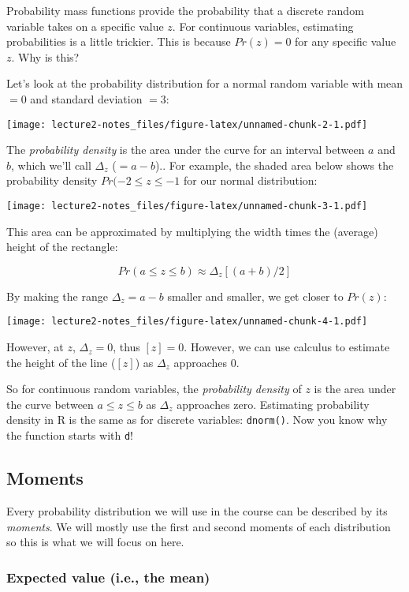 \documentclass[]{article}
\begin{document}
Probability mass functions provide the probability that a discrete
random variable takes on a specific value \(z\). For continuous
variables, estimating probabilities is a little trickier. This is
because \(Pr(z) = 0\) for any specific value \(z\). Why is this?

Let's look at the probability distribution for a normal random variable
with mean \(=0\) and standard deviation \(=3\):

\texttt{[image: lecture2-notes\_files/figure-latex/unnamed-chunk-2-1.pdf]}

The \emph{probability density} is the area under the curve for an
interval between \(a\) and \(b\), which we'll call \(\Delta_z\)
(\(=a-b\)).. For example, the shaded area below shows the probability
density \(Pr(-2 \leq z \leq -1\) for our normal distribution:

\texttt{[image: lecture2-notes\_files/figure-latex/unnamed-chunk-3-1.pdf]}

This area can be approximated by multiplying the width times the
(average) height of the rectangle:

\[Pr(a \leq z \leq b) \approx \Delta_z [(a + b)/2]\]

By making the range \(\Delta_z =a-b\) smaller and smaller, we get closer
to \(Pr(z)\):

\texttt{[image: lecture2-notes\_files/figure-latex/unnamed-chunk-4-1.pdf]}

However, at \(z\), \(\Delta_z =0\), thus \([z] = 0\). However, we can
use calculus to estimate the height of the line (\([z]\)) as
\(\Delta_z\) approaches 0.

So for continuous random variables, the \emph{probability density} of
\(z\) is the area under the curve between \(a \leq z \leq b\) as
\(\Delta_z\) approaches zero. Estimating probability density in R is the
same as for discrete variables: \texttt{dnorm()}. Now you know why the
function starts with \texttt{d}!

\hypertarget{moments}{%
\subsection{Moments}\label{moments}}

Every probability distribution we will use in the course can be
described by its \emph{moments}. We will mostly use the first and second
moments of each distribution so this is what we will focus on here.

\hypertarget{expected-value-i.e.-the-mean}{%
\subsubsection{Expected value (i.e., the
mean)}\label{expected-value-i.e.-the-mean}}
\end{document}
